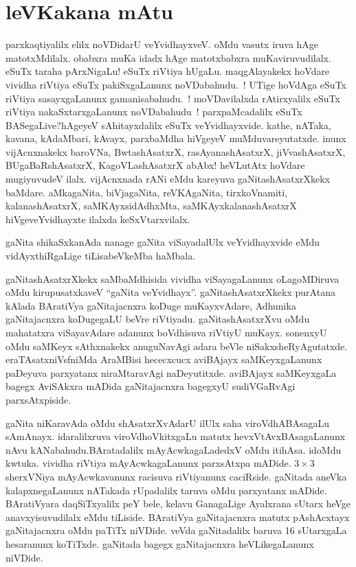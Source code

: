 \chapter*{leVKakana mAtu}


parxkaqtiyalilx elilx noVDidarU veYvidhayxveV. oMdu vasutx iruva hAge matotxMdilalx. obabxra\- muKa idadx hAge matotxbabxra muKaviruvudilalx. eSuTx taraha pArxNigaLu! eSuTx\- riVtiya hUgaLu. maqgAlayakekx hoVdare vividha riVtiya eSuTx pakiSxgaLanunx noVDabahudu.~! UTige hoVdAga eSuTx riVtiya sasayxgaLanunx gamanisabahudu.~! moVDavilalxda rAtirx\-yalilx eSuTx riVtiya nakaSxtarxgaLanunx noVDabahudu~! parxpaMcadalilx eSuTx BASegaLive?\break hAgeyeV sAhitayxdalilx eSuTx veYvidhayxvide. kathe, nATaka, kavana, kAdaMbari, kAvayx, parxbaMdha hiVgeyeV muMduvareyutatxde. inunx vijAcnxnakekx baroVNa, BwtashAsatxrX, rasAyanashAsatxrX, jiVvashAsatxrX, BUgaBaRshAsatxrX, KagoVLashAsatxrX abAbx! heVLutAtx hoVdare mugiyu\-vudeV ilalx. vijAcnxnada rANi eMdu kareyuva gaNitashAsatxrXkekx baMdare. aMkagaNita, biVjagaNita,\- reVKAgaNita, tirxkoVnamiti, kalanashAsatxrX, saMKAyxsidAdhxMta, saMKAyxkalanashAsatxrX hiVge\break veYvidhayxte ilalxda keSxVtarxvilalx.

gaNita shikaSxkanAda nanage gaNita viSayadalUlx veYvidhayxvide eMdu vidAyxthiRgaLige tiLisabeVkeMba haMbala.

gaNitashAsatxrXkekx saMbaMdhisida vividha viSayagaLanunx oLagoMDiruva oMdu kirupusatxkaveV ``gaNita veYvidhayx''. gaNitashAsatxrXkekx purAtana kAlada BAratiVya gaNitajacnxra koDuge muKayxvAdare, Adhunika gaNitajacnxra koDugegaLU beVre riVtiyadu. gaNitashAsatxrXvu oMdu mahatatxra viSayavAdare adanunx boVdhisuva riVtiyU muKayx. sonenxyU oMdu saMKeyx sAthxnakekx anuguNavAgi adara beVle niSakxsheRyAgutatxde. eraTAsatxniVsfniMda AraMBisi hececxcucx aviBAjayx saMKeyxgaLanunx paDeyuva parxyatanx niraMtaravAgi naDeyutitxde. aviBAjayx saMKeyxgaLa bagegx AviSAkxra mADida gaNitajacnxra bagegxyU sudiVGaRvAgi parxsAtxpiside.

gaNita niKaravAda oMdu shAsatxrXvAdarU ilUlx saha viroVdhABAsagaLu sAmAnayx. idaralilxruva viroVdhoVkitxgaLu matutx hevxVtAvxBAsagaLanunx nAvu kANabahudu.\break BAratadalilx mAyAcwkagaLadedxV oMdu itihAsa. idoMdu kwtuka. vividha riVtiya mAyA\-cwkagaLanunx parxsAtxpa mADide. $3\times 3$ sherxVNiya mAyAcwkavanunx racisuva riVtiyanunx caciRside. gaNitada aneVka kalapxnegaLanunx nATakada rUpadalilx taruva oMdu parxya\-tanx mADide. BAratiVyara daqSiTxyalilx peY bele, kelavu GanagaLige Ayalxrana sUtarx heVge anavxyisuvudilalx eMdu tiLiside. BAratiVya gaNitajacnxra matutx pAshAcxtayx gaNitaja\-cnxra oMdu paTiTx niVDide. veVda gaNitadalilx baruva {\rm 16} sUtarxgaLa hesaranunx koTiTxde. gaNitada bagegx gaNitajacnxra heVLikegaLanunx niVDide.

